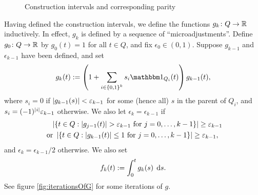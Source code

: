 \begin{figure}
    \centering
    \caption{Construction intervals and corresponding parity}
    \label{fig:binaryIntervals}
\end{figure}

Having defined the construction intervals, we define the functions $g_k \colon Q \to \mathbb{R}$ inductively. In effect, $g_k$ is defined by a sequence of ``microadjustments''. Define $g_0 \colon Q \to \mathbb{R}$ by $g_0(t) = 1$ for all $t \in Q$, and fix $\epsilon_0 \in (0,1)$. Suppose $g_{k-1}$ and $\epsilon_{k-1}$ have been defined, and set 
\begin{equation}
    g_k(t) := \parens{1 + \sum_{i \in \set{0,1}^k} s_i \bbone_{Q_i}(t)} g_{k-1}(t),
\end{equation}
where $s_i = 0$ if $\left\vert {g_{k-1}(s)} \right\vert < \varepsilon_{k-1}$ for some (hence all) $s$ in the parent of $Q_i$, and $s_i = (-1)^{\left\vert {i} \right\vert} \varepsilon_{k-1}$ otherwise. We also let $\epsilon_k = \epsilon_{k-1}$ if 
\begin{equation} \begin{aligned}
    &\quad \left\vert {\left\{ {t \in Q : \left\vert {g_{j-1}(t)} \right\vert > \varepsilon_{k-1} \text{ for } j = 0,\dots,k-1} \right\}} \right\vert \geq \varepsilon_{k-1} \\
    & \text{ or } \left\vert {\left\{ {t \in Q : \left\vert {g_{k-1}(t)} \right\vert \leq 1 \text{ for } j = 0,\dots,k-1} \right\}} \right\vert \geq \varepsilon_{k-1},
\end{aligned} \end{equation}
and $\epsilon_k = \epsilon_{k-1}/2$ otherwise. We also set 
\begin{equation}
    f_k(t) := \int_0^t g_k(s) \; \operatorname{d}\!{s}.
\end{equation}
See figure \ref{fig:iterationsOfG} for some iterations of $g$.

